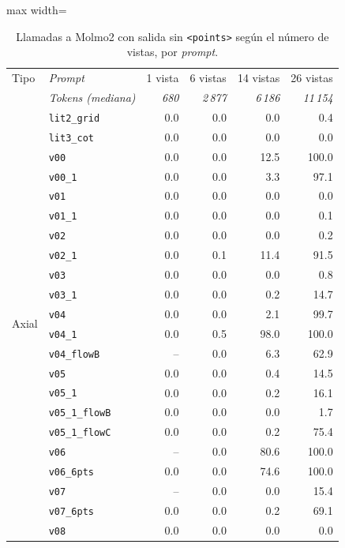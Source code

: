 \begin{table}[htbp]
\centering
\caption{Llamadas a Molmo2 con salida sin \texttt{<points>} según el número de vistas, por \textit{prompt}.}
\label{tab:tokens_formato_tracks}
\begin{lrbox}{\tablebox}
\begin{adjustbox}{max width=\textwidth}
\begin{tabular}{llrrrr}
\toprule
Tipo & \textit{Prompt} & 1 vista & 6 vistas & 14 vistas & 26 vistas \\
 & \textit{Tokens (mediana)} & \textit{680} & \textit{2\,877} & \textit{6\,186} & \textit{11\,154} \\
\midrule
\multirow{22}{*}{Axial} & \texttt{lit2\_grid} & 0.0 & 0.0 & 0.0 & 0.4 \\
 & \texttt{lit3\_cot} & 0.0 & 0.0 & 0.0 & 0.0 \\
 & \texttt{v00} & 0.0 & 0.0 & 12.5 & 100.0 \\
 & \texttt{v00\_1} & 0.0 & 0.0 & 3.3 & 97.1 \\
 & \texttt{v01} & 0.0 & 0.0 & 0.0 & 0.0 \\
 & \texttt{v01\_1} & 0.0 & 0.0 & 0.0 & 0.1 \\
 & \texttt{v02} & 0.0 & 0.0 & 0.0 & 0.2 \\
 & \texttt{v02\_1} & 0.0 & 0.1 & 11.4 & 91.5 \\
 & \texttt{v03} & 0.0 & 0.0 & 0.0 & 0.8 \\
 & \texttt{v03\_1} & 0.0 & 0.0 & 0.2 & 14.7 \\
 & \texttt{v04} & 0.0 & 0.0 & 2.1 & 99.7 \\
 & \texttt{v04\_1} & 0.0 & 0.5 & 98.0 & 100.0 \\
 & \texttt{v04\_flowB} & -- & 0.0 & 6.3 & 62.9 \\
 & \texttt{v05} & 0.0 & 0.0 & 0.4 & 14.5 \\
 & \texttt{v05\_1} & 0.0 & 0.0 & 0.2 & 16.1 \\
 & \texttt{v05\_1\_flowB} & 0.0 & 0.0 & 0.0 & 1.7 \\
 & \texttt{v05\_1\_flowC} & 0.0 & 0.0 & 0.2 & 75.4 \\
 & \texttt{v06} & -- & 0.0 & 80.6 & 100.0 \\
 & \texttt{v06\_6pts} & 0.0 & 0.0 & 74.6 & 100.0 \\
 & \texttt{v07} & -- & 0.0 & 0.0 & 15.4 \\
 & \texttt{v07\_6pts} & 0.0 & 0.0 & 0.2 & 69.1 \\
 & \texttt{v08} & 0.0 & 0.0 & 0.0 & 0.0 \\

\end{tabular}
\end{adjustbox}
\end{lrbox}
\end{table}
